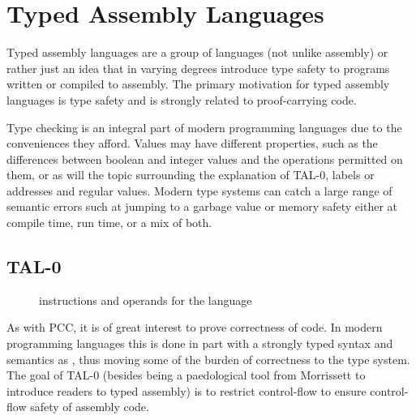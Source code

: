 \section{Typed Assembly Languages}

Typed assembly languages are a group of languages (not unlike assembly) or
rather just an idea that in varying degrees introduce type safety to programs
written or compiled to assembly. The primary motivation for typed assembly
languages is type safety and is strongly related to proof-carrying
code\cite[ch. 5]{attpl}.



Type checking is an integral part of modern programming languages due to the
conveniences they afford.
Values may have different properties, such as the differences between boolean
and integer values and the operations permitted on them, or as will the topic
surrounding the explanation of TAL-0, labels or addresses and regular values.
Modern type systems can catch a large range of
semantic errors such at jumping to a garbage value or memory safety either at
compile time, run time, or a mix of both\cite{pldi}.


\subsection{TAL-0}
\begin{figure}
    
    \caption{instructions and operands for the \talz language}
    \label{eq:tal0-ops}
\end{figure}

As with PCC, it is of great interest to prove correctness of code. In modern
programming languages this is done in part with a strongly typed syntax and
semantics as , thus moving some
of the burden of correctness to the type system.
The goal of TAL-0 (besides being a paedological tool from Morrissett to
introduce readers to typed assembly) is to restrict control-flow to ensure
control-flow safety of assembly code.

